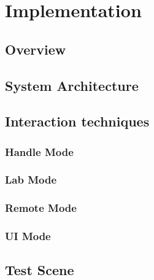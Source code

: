 \chapter{Implementation}

\section{Overview}


\section{System Architecture}


\section{Interaction techniques}
\subsection{Handle Mode}
\subsection{Lab Mode}
\subsection{Remote Mode}
\subsection{UI Mode}


\section{Test Scene}